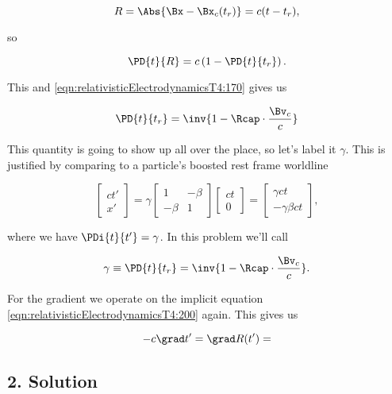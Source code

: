 \begin{equation}\label{eqn:relativisticElectrodynamicsT4:200}
R = \Abs{\Bx - \Bx_c(t_r)} = c(t - t_r),
\end{equation}

so 

\begin{equation}\label{eqn:relativisticElectrodynamicsT4:220}
\PD{t}{R} = c\left(1 - \PD{t}{t_r}\right).
\end{equation}

This and \ref{eqn:relativisticElectrodynamicsT4:170} gives us

\begin{equation}\label{eqn:relativisticElectrodynamicsT4:240}
\PD{t}{t_r} = \inv{ 1 -\Rcap \cdot \frac{\Bv_c}{c} }
\end{equation}

This quantity is going to show up all over the place, so let's label it $\gamma$.  This is justified by comparing to a particle's boosted rest frame worldline

\begin{equation}\label{eqn:relativisticElectrodynamicsT4:260}
\begin{bmatrix}
c t' \\
x'
\end{bmatrix}
=
\gamma
\begin{bmatrix}
1 & -\beta \\
-\beta & 1
\end{bmatrix}
\begin{bmatrix}
c t \\
0
\end{bmatrix}
= 
\begin{bmatrix}
\gamma c t \\
-\gamma \beta c t
\end{bmatrix},
\end{equation}

where we have $\PDi{t}{t'} = \gamma$.  In this problem we'll call

\begin{equation}\label{eqn:relativisticElectrodynamicsT4:280}
\gamma \equiv \PD{t}{t_r} = \inv{ 1 -\Rcap \cdot \frac{\Bv_c}{c} }.
\end{equation}

For the gradient we operate on the implicit equation \ref{eqn:relativisticElectrodynamicsT4:200} again.  This gives us

\begin{equation}\label{eqn:relElectroDynProblemSet5:n}
- c \grad t' = \grad R(t') =
\end{equation}

\subsection{2. Solution}

\EndArticle
